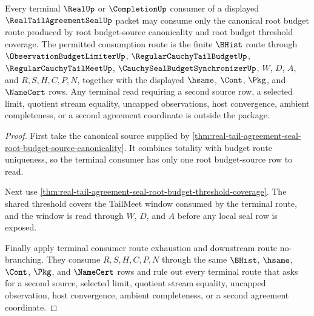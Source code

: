 \begin{theorem}
\label{thm:real-tail-agreement-seal-root-budget-terminal-consumption}
Every terminal $\RealUp$ or $\CompletionUp$ consumer of a displayed $\RealTailAgreementSealUp$ packet may consume only the canonical root budget route produced by root budget-source canonicality and root budget threshold coverage. The permitted consumption route is the finite $\BHist$ route through $\ObservationBudgetLimiterUp$, $\RegularCauchyTailBudgetUp$, $\RegularCauchyTailMeetUp$, $\CauchySealBudgetSynchronizerUp$, $W$, $D$, $A$, and $R,S,H,C,P,N$, together with the displayed $\hsame$, $\Cont$, $\Pkg$, and $\NameCert$ rows. Any terminal read requiring a second source row, a selected limit, quotient stream equality, uncapped observations, host convergence, ambient completeness, or a second agreement coordinate is outside the package.
\end{theorem}
\begin{proof}
First take the canonical source supplied by \autoref{thm:real-tail-agreement-seal-root-budget-source-canonicality}. It combines totality with budget route uniqueness, so the terminal consumer has only one root budget-source row to read.

Next use \autoref{thm:real-tail-agreement-seal-root-budget-threshold-coverage}. The shared threshold covers the TailMeet window consumed by the terminal route, and the window is read through $W$, $D$, and $A$ before any local seal row is exposed.

Finally apply terminal consumer route exhaustion and downstream route no-branching. They consume $R,S,H,C,P,N$ through the same $\BHist$, $\hsame$, $\Cont$, $\Pkg$, and $\NameCert$ rows and rule out every terminal route that asks for a second source, selected limit, quotient stream equality, uncapped observation, host convergence, ambient completeness, or a second agreement coordinate.
\end{proof}

